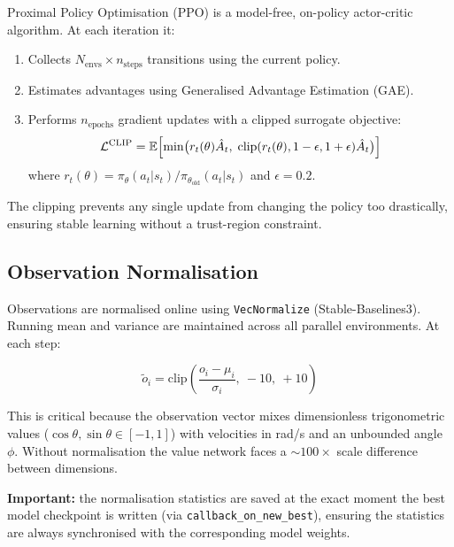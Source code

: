 \documentclass[12pt,a4paper]{article}
\begin{document}
Proximal Policy Optimisation (PPO) \cite{schulman2017proximal} is a model-free,
on-policy actor-critic algorithm. At each iteration it:
\begin{enumerate}
    \item Collects $N_{\text{envs}} \times n_{\text{steps}}$ transitions using the
          current policy.
    \item Estimates advantages using Generalised Advantage Estimation (GAE).
    \item Performs $n_{\text{epochs}}$ gradient updates with a clipped surrogate
          objective:
          \begin{equation}
          \mathcal{L}^{\text{CLIP}} =
          \mathbb{E}\Bigl[\min\bigl(r_t(\theta)\hat{A}_t,\;
          \text{clip}(r_t(\theta), 1-\epsilon, 1+\epsilon)\hat{A}_t\bigr)\Bigr]
          \end{equation}
          where $r_t(\theta) = \pi_\theta(a_t|s_t)/\pi_{\theta_{\text{old}}}(a_t|s_t)$
          and $\epsilon = 0.2$.
\end{enumerate}

\noindent The clipping prevents any single update from changing the policy too
drastically, ensuring stable learning without a trust-region constraint.

\subsection{Observation Normalisation}

Observations are normalised online using \texttt{VecNormalize}
(Stable-Baselines3). Running mean and variance are maintained across all
parallel environments. At each step:

\begin{equation}
\tilde{o}_i = \text{clip}\!\left(\frac{o_i - \mu_i}{\sigma_i},\ -10,\ +10\right)
\end{equation}

\noindent This is critical because the observation vector mixes dimensionless
trigonometric values ($\cos\theta, \sin\theta \in [-1,1]$) with velocities in
rad/s and an unbounded angle $\phi$. Without normalisation the value network
faces a $\sim\!100\times$ scale difference between dimensions.

\textbf{Important:} the normalisation statistics are saved at the exact moment
the best model checkpoint is written (via \texttt{callback\_on\_new\_best}),
ensuring the statistics are always synchronised with the corresponding model
weights.
\end{document}

